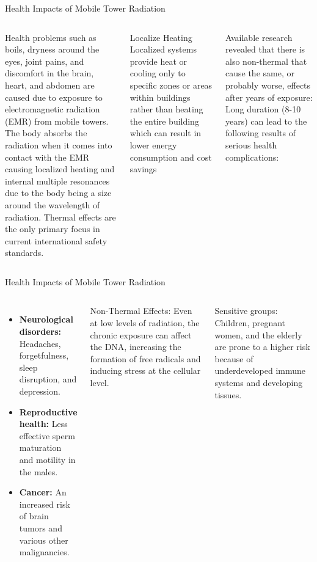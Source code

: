 \documentclass[7pt, aspectratio=169]{beamer}
\begin{document}
\begin{frame}{Health Impacts of Mobile Tower Radiation}
\begin{columns}
    Health problems such as boils, dryness around the eyes, joint pains, and discomfort in the brain, heart, and abdomen are caused due to exposure to electromagnetic radiation (EMR) from mobile towers.\\
    \vspace{0.1cm}
    The body absorbs the radiation when it comes into contact with the EMR causing localized heating and internal multiple resonances due to the body being a size around the wavelength of radiation. Thermal effects are the only primary focus in current international safety standards.\autocite{kumar2009biological}

    
    \begin{block}{Localize Heating}
    Localized systems provide heat or cooling only to specific zones or areas within buildings rather than heating the entire building which can result in lower energy consumption and cost savings\\
    \end{block}
     Available research revealed that there is also non-thermal that cause the same, or probably worse, effects after years of exposure: Long duration (8-10 years) can lead to the following results of serious health complications:

    
\end{columns}
    
\end{frame}
\begin{frame}{Health Impacts of Mobile Tower Radiation}
\begin{columns}
    \begin{itemize}
        \item \textbf{Neurological disorders:} Headaches, forgetfulness, sleep disruption, and depression.
        \item \textbf{Reproductive health:} Less effective sperm maturation and motility in the males.
        \item \textbf{Cancer:} An increased risk of brain tumors and various other malignancies.
    \end{itemize}
    \begin{block}{Non-Thermal Effects:}
        Even at low levels of radiation, the chronic exposure can affect the DNA, increasing the formation of free radicals and inducing stress at the cellular level.
    \end{block}
    \begin{block}{Sensitive groups:}
        Children, pregnant women, and the elderly are prone to a higher risk because of underdeveloped immune systems and developing tissues.
    \end{block}

    
\end{columns}
    
\end{frame}
\end{document}
